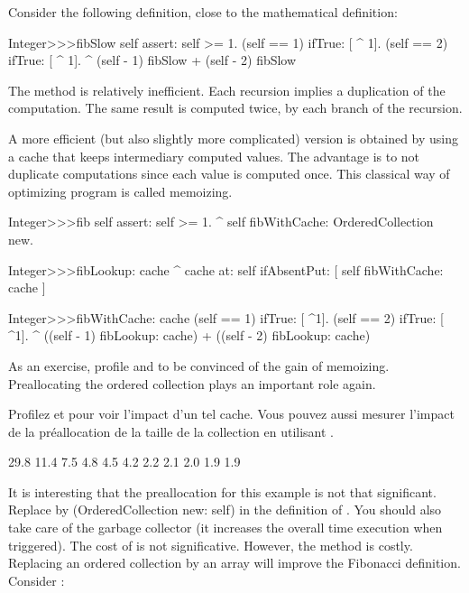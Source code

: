\documentclass[a4paper,10pt,twoside]{book}
\begin{document}
Consider the following definition, close to the mathematical definition:
\begin{code}{}
Integer>>>fibSlow
	self assert: self >= 1.
	(self == 1) ifTrue: [ ^ 1].
	(self == 2) ifTrue: [ ^ 1].
	^ (self - 1) fibSlow + (self - 2) fibSlow
\end{code}

The method  is relatively inefficient. Each recursion implies a duplication of the computation. The same result is computed twice, by each branch of the recursion.

A more efficient (but also slightly more complicated) version is obtained by using a cache that keeps intermediary computed values. The advantage is to not duplicate computations since each value is computed once. This classical way of optimizing program is called memoizing. 
      
\begin{code}{}
Integer>>>fib
	self assert: self >= 1.
	^ self fibWithCache: OrderedCollection new.

Integer>>>fibLookup: cache
	^ cache at: self ifAbsentPut: [ self fibWithCache: cache ] 

Integer>>>fibWithCache: cache
	(self == 1) ifTrue: [ ^1].
	(self == 2) ifTrue: [ ^1].
	^ ((self - 1) fibLookup: cache) + ((self - 2) fibLookup: cache)
\end{code}

As an exercise, profile  and  to be convinced of the gain of memoizing. Preallocating the ordered collection plays an important role again.

Profilez  et  pour voir l'impact d'un tel
cache. Vous pouvez aussi mesurer l'impact de la pr\'eallocation de la
taille de la collection en utilisant .

\begin{code}{}
29.8%
11.4%
7.5%
4.8%
4.5%
4.2%
2.2%
2.1%
2.0%
1.9%
1.9%
\end{code}

It is interesting that the preallocation for this example is not that significant. Replace  by {(OrderedCollection new: self)} in the definition of . You should also take care of the garbage collector (it increases the overall time execution when triggered). The cost of   is not significative. However, the method  is costly. Replacing an ordered collection by an array will improve the Fibonacci definition. Consider :
\end{document}
